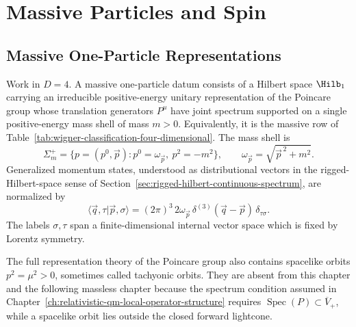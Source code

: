 \chapter{Massive Particles and Spin}
\label{ch:massive-particles-spin}
\ConventionsLorentzian


\section{Massive One-Particle Representations}

\begin{definition}
\label{def:massive-one-particle-spin-datum}
Work in \(D=4\). A massive one-particle datum consists of a Hilbert space
\(\Hilb_1\) carrying an irreducible positive-energy unitary representation of
the Poincare group whose translation generators \(P^\mu\) have joint spectrum
supported on a single positive-energy mass shell of mass \(m>0\).
Equivalently, it is the massive row of
Table~\ref{tab:wigner-classification-four-dimensional}. The mass shell is
\[
  \Sigma_m^+
  =
  \{p=(p^0,\vec p):p^0=\omega_{\vec p},\ p^2=-m^2\},
  \qquad
  \omega_{\vec p}=\sqrt{\vec p^{\,2}+m^2}.
\]
Generalized momentum states, understood as distributional vectors in the
rigged-Hilbert-space sense of
Section~\ref{sec:rigged-hilbert-continuous-spectrum}, are normalized by
\[
  \langle \vec q,\tau|\vec p,\sigma\rangle
  =
  (2\pi)^3\,2\omega_{\vec p}\,
  \delta^{(3)}(\vec q-\vec p)\,\delta_{\tau\sigma}.
\]
The labels \(\sigma,\tau\) span a finite-dimensional internal vector space
which is fixed by Lorentz symmetry.
\end{definition}

\begin{remark}
The full representation theory of the Poincare group also contains spacelike
orbits \(p^2=\mu^2>0\), sometimes called tachyonic orbits.  They are absent
from this chapter and the following massless chapter because the spectrum
condition assumed in Chapter~\ref{ch:relativistic-qm-local-operator-structure}
requires \(\operatorname{Spec}(P)\subset\overline V_+\), while a spacelike orbit
lies outside the closed forward lightcone.
\end{remark}

